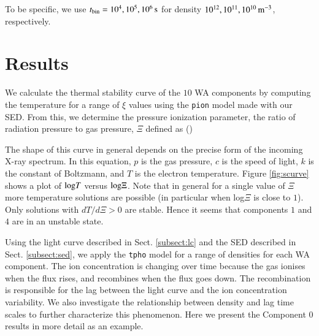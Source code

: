 \documentclass{aa}
\begin{document}
To be specific, we use $t_{\rm bin} = 10^4, 10^5, 10^6 \, \rm s$ for density $10^{12}, 10^{11}, 10^{10} \, \rm m^{-3}$, respectively.







\section{Results}\label{sect:3}
We calculate the thermal stability curve of the $10$ WA components by computing the temperature for a range of $\xi$ values using the \texttt{pion} model made with our SED.
From this, we determine the pressure ionization parameter, the ratio of radiation pressure to gas pressure, 
$\Xi$ defined as (\citealp{Krolik1981ApJ})

The shape of this curve in general depends on the precise form of the incoming X-ray spectrum.
In this equation, $p$ is the gas pressure, $c$ is the speed of light, $k$ is the constant of Boltzmann, and $T$ is the electron temperature.
Figure \ref{fig:scurve} shows a plot of $\rm log \it T$ versus $\rm log \Xi$.
Note that in general for a single value of $\Xi$ more temperature solutions are possible (in particular when log$\Xi$ is close to $1$).
Only solutions with $dT / d\Xi > 0$ are stable.
Hence it seems that components $1$ and $4$ are in an unstable state.


%




Using the light curve described in Sect. \ref{subsect:lc} and the SED described in Sect. \ref{subsect:sed}, we apply the \texttt{tpho} model for a range of densities for each WA component.
The ion concentration is changing over time because the gas ionises when the flux rises, and recombines when the flux goes down. 
The recombination is responsible for the lag between the light curve and the ion concentration variability. 
We also investigate the relationship between density and lag time scales to further characterize this phenomenon.
Here we present the Component 0 results in more detail as an example.
\end{document}

